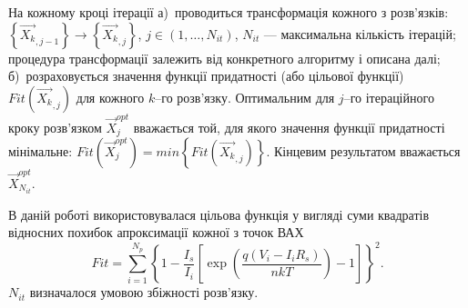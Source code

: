 На кожному кроці ітерації
а)~проводиться трансформація кожного з розв'язків:
$\left\{\overrightarrow{X_{k}}_{,j-1}\right\}\rightarrow\left\{\overrightarrow{X_{k}}_{,j}\right\}$,
$j\in(1,\ldots, N_{it})$,
$N_{it}$ --- максимальна кількість ітерацій;
процедура трансформації залежить від конкретного алгоритму і описана далі;
б)~розраховується значення функції придатності (або цільової функції) $Fit(\overrightarrow{X_k}_{,j})$
для кожного $k$--го розв'язку.
Оптимальним для $j$--го ітераційного кроку розв'язком $\overrightarrow{X}_{j}^{opt}$ вважається той, для якого
значення функції придатності мінімальне:
$Fit(\overrightarrow{X}_{j}^{opt})=min\left\{Fit(\overrightarrow{X_k}_{,j})\right\}$.
Кінцевим результатом вважається $\overrightarrow{X}_{N_{it}}^{opt}$.

В даній роботі використовувалася цільова функція у вигляді суми квадратів відносних похибок апроксимації кожної з точок ВАХ
\begin{equation}
\label{eqEAFit}
Fit=\sum_{i=1}^{N_p}\left\{1-\frac{I_s}{I_i}\left[\exp\left(\frac{q(V_i-I_iR_s)}{nkT}\right)-1\right]\right\}^2.
\end{equation}
$N_{it}$ визначалося умовою збіжності розв'язку.

